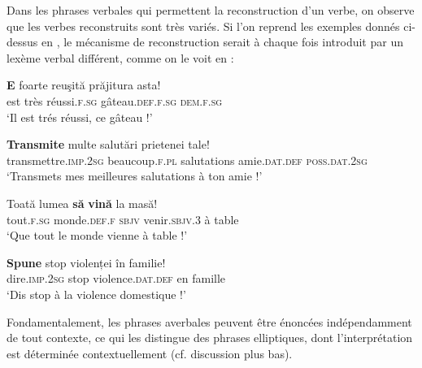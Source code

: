 Dans les phrases verbales qui permettent la reconstruction d’un verbe, on observe que les verbes reconstruits sont très variés. Si l’on reprend les exemples donnés ci-dessus en , le mécanisme de reconstruction serait à chaque fois introduit par un lexème verbal différent, comme on le voit en  :

\ea \label{ch1:ex38}
\ea
\gll \textbf{E}  foarte  reuşită  prăjitura  asta!\\
    est  très   réussi.\textsc{f.sg}  gâteau.\textsc{def.f.sg}  \textsc{dem.f.sg}\\
\glt ‘Il est trés réussi, ce gâteau !’ 

\ex  
\gll \textbf{Transmite}  multe  salutări  prietenei  tale!\\
    transmettre.\textsc{imp.2sg} beaucoup\textsc{.f.pl}  salutations  amie.\textsc{dat.def}  \textsc{poss.dat.2sg}\\
\glt ‘Transmets mes meilleures salutations à ton amie !’ 

\ex  
\gll Toată  lumea  \textbf{să} \textbf{vină} la  masă!\\
  tout\textsc{.f.sg}  monde\textsc{.def.f}  \textsc{sbjv}  venir.\textsc{sbjv.3}  à  table\\
\glt ‘Que tout le monde vienne à table !’ 

\ex
\gll  \textbf{Spune}  stop  violenței  în  familie!\\
    dire.\textsc{imp.2sg}  stop  violence\textsc{.dat.def}  en  famille\\
\glt ‘Dis stop à la violence domestique !’ 
\z
\z

Fondamentalement, les phrases averbales peuvent être énoncées indépendamment de tout contexte, ce qui les distingue des phrases elliptiques, dont l’interprétation est déterminée contextuellement (cf. discussion plus bas).

